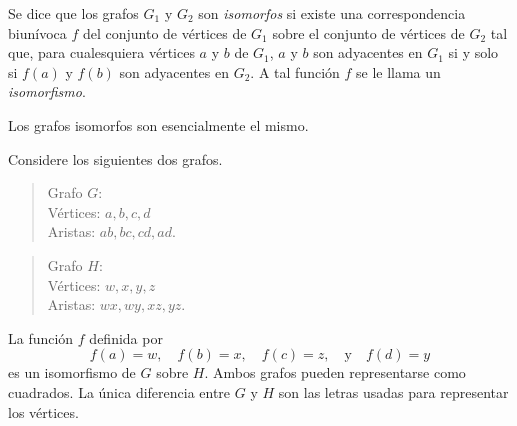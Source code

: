 \message{ !name(main.tex)}\documentclass[12pt,a4paper]{book}
\begin{document}
    \begin{definicion}\label{def:isomorfismo-grafos}
        Se dice que los grafos $G_{1}$ y $G_{2}$ son \textit{isomorfos} si existe una correspondencia biunívoca $f$ del
        conjunto de vértices de $G_{1}$ sobre el conjunto de vértices de $G_{2}$ tal que, para cualesquiera vértices $a$ y
        $b$ de $G_{1}$, $a$ y $b$ son adyacentes en $G_{1}$ si y solo si $f(a)$ y $f(b)$ son adyacentes en $G_{2}$. A tal
        función $f$ se le llama un \textit{isomorfismo}.
    \end{definicion}

    Los grafos isomorfos son esencialmente el mismo.

    \begin{ejemplo}\label{ej:grafos-isomorfos}
        Considere los siguientes dos grafos.

        \begin{quote}
            Grafo $G$:\\
            Vértices: $a,b,c,d$\\
            Aristas: $ab,bc,cd,ad$.
        \end{quote}

        \begin{quote}
            Grafo $H$:\\
            Vértices: $w,x,y,z$\\
            Aristas: $wx,wy,xz,yz$.
        \end{quote}

        La función $f$ definida por
        \begin{equation*}
            f(a)=w,\quad f(b)=x,\quad f(c)=z,\quad\text{y}\quad f(d)=y
        \end{equation*}
        es un isomorfismo de $G$ sobre $H$. Ambos grafos pueden representarse como cuadrados. La única diferencia entre
        $G$ y $H$ son las letras usadas para representar los vértices.
    \end{ejemplo}
\end{document}
